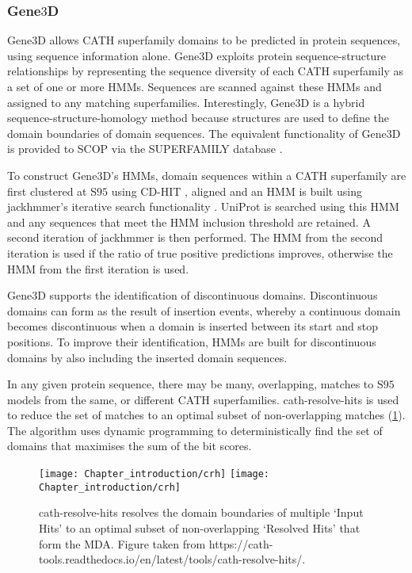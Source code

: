 \subsubsection{Gene$3$D}
\label{sec:intro-gene3d}

Gene$3$D \cite{Lees2012,Lees2014,Lewis2018} allows CATH superfamily domains to be predicted in protein sequences, using sequence information alone. Gene$3$D exploits protein sequence-structure relationships by representing the sequence diversity of each CATH superfamily as a set of one or more HMMs. Sequences are scanned against these HMMs and assigned to any matching superfamilies. Interestingly, Gene$3$D is a hybrid sequence-structure-homology method because structures are used to define the domain boundaries of domain sequences.
The equivalent functionality of Gene$3$D is provided to SCOP via the SUPERFAMILY database \cite{Pandurangan2019}.

To construct Gene$3$D's HMMs, domain sequences within a CATH superfamily are first clustered at S$95$ using CD-HIT \cite{Fu2012}, aligned and an HMM is built using jackhmmer's iterative search functionality \cite{Mistry2013}. UniProt is searched using this HMM and any sequences that meet the HMM inclusion threshold are retained. A second iteration of jackhmmer is then performed. The HMM from the second iteration is used if the ratio of true positive predictions improves, otherwise the HMM from the first iteration is used.

Gene$3$D supports the identification of discontinuous domains. Discontinuous domains can form as the result of insertion events, whereby a continuous domain becomes discontinuous when a domain is inserted between its start and stop positions. To improve their identification, HMMs are built for discontinuous domains by also including the inserted domain sequences.

In any given protein sequence, there may be many, overlapping, matches to S$95$ models from the same, or different CATH superfamilies. cath-resolve-hits \cite{Lewis2019} is used to reduce the set of matches to an optimal subset of non-overlapping matches (\ref{fig:crh}). The algorithm uses dynamic programming to deterministically find the set of domains that maximises the sum of the bit scores.

\begin{figure}[!hbt]
    \centering
    \ifredact
        \texttt{[image: Chapter\_introduction/crh]}
    \else
        \texttt{[image: Chapter\_introduction/crh]}
    \fi
    \caption{%
        cath-resolve-hits resolves the domain boundaries of multiple `Input Hits' to an optimal subset of non-overlapping `Resolved Hits' that form the MDA.
        Figure taken from https://cath-tools.readthedocs.io/en/latest/tools/cath-resolve-hits/.
    }
    \label{fig:crh}
\end{figure}

